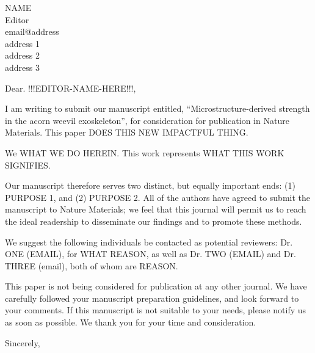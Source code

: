 \documentclass[10pt,letterpaper]{letter}
\begin{document}
 
\begin{letter}{NAME\\
Editor\\
email@address\\
address 1\\
address 2\\
address 3}
\opening{Dear. !!!EDITOR-NAME-HERE!!!,} 
 
I am writing to submit our manuscript entitled, ``Microstructure-derived strength in the acorn weevil exoskeleton'', for consideration for publication in Nature Materials.
This paper DOES THIS NEW IMPACTFUL THING.

We WHAT WE DO HEREIN.
This work represents WHAT THIS WORK SIGNIFIES.

Our manuscript therefore serves two distinct, but equally important ends: (1) PURPOSE 1, and (2) PURPOSE 2.
All of the authors have agreed to submit the manuscript to Nature Materials; we feel that this journal will permit us to reach the ideal readership to disseminate our findings and to promote these methods.

We suggest the following individuals be contacted as potential reviewers: Dr. ONE (EMAIL), for WHAT REASON, as well as Dr. TWO (EMAIL) and Dr. THREE (email), both of whom are REASON. 

This paper is not being considered for publication at any other journal.
We have carefully followed your manuscript preparation guidelines, and look forward to your comments.
If this manuscript is not suitable to your needs, please notify us as soon as possible.
We thank you for your time and consideration.

\closing{Sincerely,}

\newpage

\end{letter} 
\end{document}
